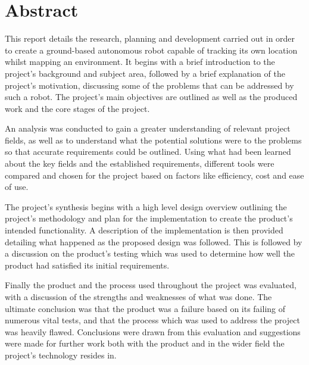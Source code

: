 \chapter{Abstract}
This report details the research, planning and development carried out in order to create a ground-based autonomous robot capable of tracking its own location whilst mapping an environment. It begins with a brief introduction to the project's background and subject area, followed by a brief explanation of the project's motivation, discussing some of the problems that can be addressed by such a robot. The project's main objectives are outlined as well as the produced work and the core stages of the project.

An analysis was conducted to gain a greater understanding of relevant project fields, as well as to understand what the potential solutions were to the problems so that accurate requirements could be outlined. Using what had been learned about the key fields and the established requirements, different tools were compared and chosen for the project based on factors like efficiency, cost and ease of use.

The project's synthesis begins with a high level design overview outlining the project's methodology and plan for the implementation to create the product's intended functionality. A description of the implementation is then provided detailing what happened as the proposed design was followed. This is followed by a discussion on the product's testing which was used to determine how well the product had satisfied its initial requirements.

Finally the product and the process used throughout the project was evaluated, with a discussion of the strengths and weaknesses of what was done. The ultimate conclusion was that the product was a failure based on its failing of numerous vital tests, and that the process which was used to address the project was heavily flawed. Conclusions were drawn from this evaluation and suggestions were made for further work both with the product and in the wider field the project's technology resides in.




